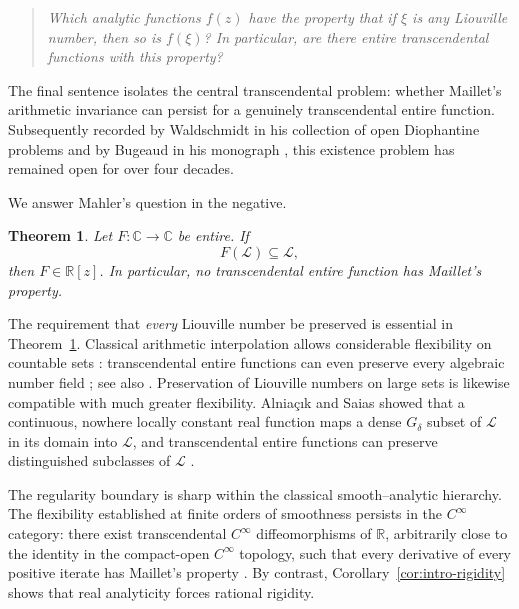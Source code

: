 \documentclass[11pt]{amsart}
\numberwithin{equation}{section}
\newtheorem{theorem}{Theorem}[section]
\theoremstyle{definition}
\theoremstyle{remark}
\newcommand{\R}{\mathbb R}
\newcommand{\Q}{\mathbb Q}
\newcommand{\C}{\mathbb C}
\newcommand{\Lio}{\mathscr L}
\begin{document}
\begin{quote}
\emph{Which analytic functions $f(z)$ have the property that if $\xi$ is
any Liouville number, then so is $f(\xi)$? In particular, are there entire
transcendental functions with this property?}
\end{quote}

The final sentence isolates the central transcendental problem: whether Maillet's arithmetic invariance can persist for a genuinely transcendental entire function. Subsequently recorded by Waldschmidt in his collection of open Diophantine problems \cite[Question~3.27, p.~281]{Waldschmidt2004} and by Bugeaud in his monograph \cite[Problem~44, p.~215]{Bugeaud2004}, this existence problem has remained open for over four decades.

We answer Mahler's question in the negative.

\begin{theorem}\label{thm:intro-mahler}
Let $F:\C\to\C$ be entire. If
\[
F(\Lio)\subseteq\Lio,
\]
then $F\in\R[z]$. In particular, no transcendental entire function has
Maillet's property.
\end{theorem}


The requirement that \emph{every} Liouville number be preserved
is essential in Theorem~\ref{thm:intro-mahler}. Classical arithmetic
interpolation allows considerable flexibility on countable sets
\cite{Stackel1895,Stackel1902,Weierstrass1923}: transcendental entire
functions can even preserve every algebraic number field
\cite{VanderPoorten1968}; see also
\cite{BoxallJones2015,Lombardo2017,Surroca2006}.
Preservation of Liouville numbers on large sets is likewise
compatible with much greater flexibility. Alnia\c{c}{\i}k and Saias
\cite{AlniacikSaias1994} showed that a continuous, nowhere locally
constant real function maps a dense $G_\delta$ subset of $\Lio$
in its domain into $\Lio$, and transcendental entire functions
can preserve distinguished subclasses of $\Lio$
\cite{MarquesMoreira2015,MarquesSchleischitz2016}.

The regularity boundary is sharp within the classical
smooth--analytic hierarchy. The flexibility established at finite
orders of smoothness \cite{LelisMoreiraSilva2026} persists in the
$C^\infty$ category: there exist transcendental $C^\infty$
diffeomorphisms of $\mathbb R$, arbitrarily close to the identity
in the compact-open $C^\infty$ topology, such that every derivative
of every positive iterate has Maillet's property
\cite{MarquesSmooth2026}. By contrast,
Corollary~\ref{cor:intro-rigidity} shows that real analyticity
forces rational rigidity.
\end{document}
